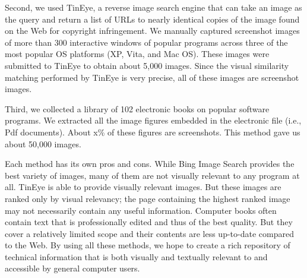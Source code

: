\documentclass{www2010-submission}
\begin{document}
Second, we used TinEye, a reverse image search engine that can
take an image as the query and return a list of URLs to nearly
identical copies of the image found on the Web for copyright
infringement. We manually captured screenshot images of more than
300 interactive windows of popular programs across three of the
most popular OS platforms (XP, Vita, and Mac OS). These images
were submitted to TinEye to obtain about 5,000 images. Since the
visual similarity matching performed by TinEye is very precise,
all of these images are screenshot images.

Third, we collected a library of 102 electronic books on popular
software programs. We extracted all the image figures embedded in
the electronic file (i.e., Pdf documents). About x\% of these
figures are screenshots. This method gave us about 50,000 images.

Each method has its own pros and cons. While Bing Image Search
provides the best variety of images, many of them are not visually
relevant to any program at all. TinEye is able to provide visually
relevant images. But these images are ranked only by visual
relevancy; the page containing the highest ranked image may not
necessarily contain any useful information. Computer books often
contain text that is professionally edited and thus of the best
quality. But they cover a relatively limited scope and their
contents are less up-to-date compared to the Web. By using all
these methods, we hope to create a rich repository of technical
information that is both visually and textually relevant to and
accessible by general computer users.


%

\end{document}
